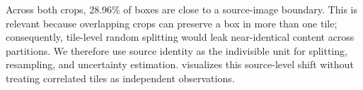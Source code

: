 Across both crops, 28.96\% of boxes are close to a source-image boundary.
This is relevant because overlapping crops can preserve a box in more than one
tile; consequently, tile-level random splitting would leak near-identical
content across partitions.  We therefore use source identity as the indivisible
unit for splitting, resampling, and uncertainty estimation.
 visualizes this source-level shift without
treating correlated tiles as independent observations.
